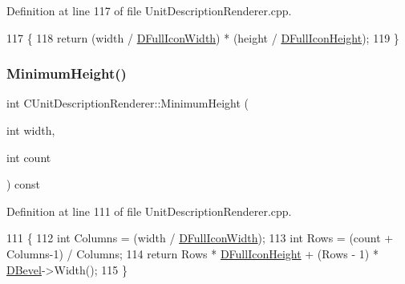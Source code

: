 Definition at line 117 of file Unit\+Description\+Renderer.\+cpp.


\begin{DoxyCode}
117                                                                      \{
118     \textcolor{keywordflow}{return} (width / \hyperlink{classCUnitDescriptionRenderer_a4bd79032fe13b9c09386a24cb8ef7650}{DFullIconWidth}) * (height / \hyperlink{classCUnitDescriptionRenderer_ae9f7d843d0eabd4b1f1b19bfa5332754}{DFullIconHeight});
119 \}
\end{DoxyCode}
\hypertarget{classCUnitDescriptionRenderer_a6899e564a8a96ba6539faee409ac93ad}{}\label{classCUnitDescriptionRenderer_a6899e564a8a96ba6539faee409ac93ad} 
\subsubsection{\texorpdfstring{Minimum\+Height()}{MinimumHeight()}}
{\footnotesize\ttfamily int C\+Unit\+Description\+Renderer\+::\+Minimum\+Height (\begin{DoxyParamCaption}\item[{int}]{width,  }\item[{int}]{count }\end{DoxyParamCaption}) const}



Definition at line 111 of file Unit\+Description\+Renderer.\+cpp.


\begin{DoxyCode}
111                                                                      \{
112     \textcolor{keywordtype}{int} Columns = (width / \hyperlink{classCUnitDescriptionRenderer_a4bd79032fe13b9c09386a24cb8ef7650}{DFullIconWidth});
113     \textcolor{keywordtype}{int} Rows = (count + Columns-1) / Columns;
114     \textcolor{keywordflow}{return} Rows * \hyperlink{classCUnitDescriptionRenderer_ae9f7d843d0eabd4b1f1b19bfa5332754}{DFullIconHeight} + (Rows - 1) * \hyperlink{classCUnitDescriptionRenderer_a9f4cd9f9d8dbc5036c885980494db41e}{DBevel}->Width();
115 \}
\end{DoxyCode}
\hypertarget{classCUnitDescriptionRenderer_aed1a5ab08252a5d550d3c26dfa979962}{}\label{classCUnitDescriptionRenderer_aed1a5ab08252a5d550d3c26dfa979962} 
